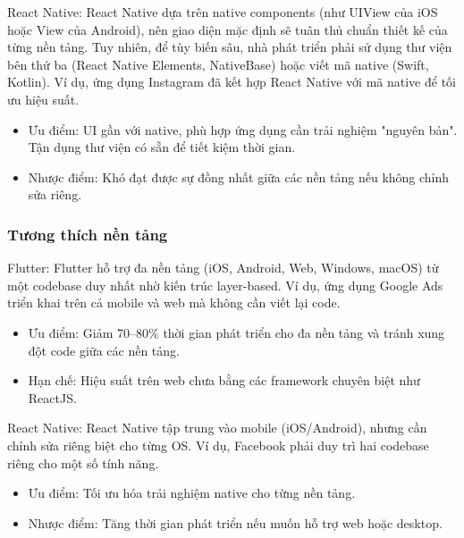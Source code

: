    \begin{flushleft}
      \hspace*{0.8cm}React Native: React Native dựa trên native components (như UIView của iOS hoặc View của Android), nên giao diện mặc định sẽ tuân thủ chuẩn thiết kế của từng nền tảng. Tuy nhiên, để tùy biến sâu, nhà phát triển phải sử dụng thư viện bên thứ ba (React Native Elements, NativeBase) hoặc viết mã native (Swift, Kotlin). Ví dụ, ứng dụng Instagram đã kết hợp React Native với mã native để tối ưu hiệu suất.
      \setlength{\leftmargini}{1.5cm}
      \begin{itemize}
          \item Ưu điểm: UI gần với native, phù hợp ứng dụng cần trải nghiệm "nguyên bản". Tận dụng thư viện có sẵn để tiết kiệm thời gian.
          \item Nhược điểm: Khó đạt được sự đồng nhất giữa các nền tảng nếu không chỉnh sửa riêng.
      \end{itemize}
    \end{flushleft}

    \subsubsection{Tương thích nền tảng}
    \begin{flushleft}
      \hspace*{0.8cm}Flutter: Flutter hỗ trợ đa nền tảng (iOS, Android, Web, Windows, macOS) từ một codebase duy nhất nhờ kiến trúc layer-based. Ví dụ, ứng dụng Google Ads triển khai trên cả mobile và web mà không cần viết lại code.
      \setlength{\leftmargini}{1.5cm}
      \begin{itemize}
        \item Ưu điểm: Giảm 70–80\% thời gian phát triển cho đa nền tảng và tránh xung đột code giữa các nền tảng.
        \item Hạn chế: Hiệu suất trên web chưa bằng các framework chuyên biệt như ReactJS.
      \end{itemize}
    \end{flushleft}

    \begin{flushleft}
      \hspace*{0.8cm}React Native: React Native tập trung vào mobile (iOS/Android), nhưng cần chỉnh sửa riêng biệt cho từng OS. Ví dụ, Facebook phải duy trì hai codebase riêng cho một số tính năng.
      \setlength{\leftmargini}{1.5cm}
      \begin{itemize}
          \item Ưu điểm: Tối ưu hóa trải nghiệm native cho từng nền tảng.
          \item Nhược điểm: Tăng thời gian phát triển nếu muốn hỗ trợ web hoặc desktop.
      \end{itemize}
    \end{flushleft}

